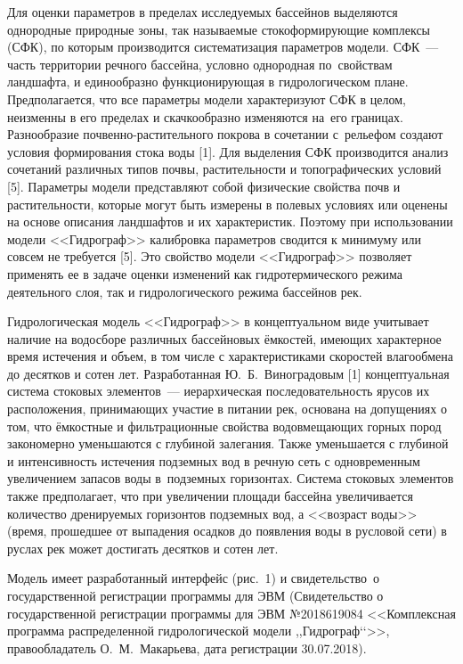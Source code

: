 Для оценки параметров в пределах исследуемых бассейнов выделяются однородные природные зоны, так называемые стокоформирующие комплексы (СФК), по которым производится систематизация параметров модели. СФК~--- часть территории речного бассейна, условно однородная по~свойствам ландшафта, и единообразно функционирующая в гидрологическом плане. Предполагается, что все параметры модели характеризуют СФК в целом, неизменны в его пределах и скачкообразно изменяются на~его границах. Разнообразие почвенно-растительного покрова в сочетании с~рельефом создают условия формирования стока воды [1]. Для выделения СФК производится анализ сочетаний различных типов почвы, растительности и топографических условий [5]. Параметры модели представляют собой физические свойства почв и растительности, которые могут быть измерены в полевых условиях или оценены на основе описания ландшафтов и их характеристик. Поэтому при использовании модели <<Гидрограф>> калибровка параметров сводится к минимуму или совсем не требуется [5]. Это свойство модели <<Гидрограф>> позволяет применять ее в задаче оценки изменений как гидротермического режима деятельного слоя, так и гидрологического режима бассейнов рек.

Гидрологическая модель <<Гидрограф>> в концептуальном виде учитывает наличие на водосборе различных бассейновых ёмкостей, имеющих характерное время истечения и объем, в том числе с характеристиками скоростей влагообмена до десятков и сотен лет. Разработанная Ю.~Б.~Виноградовым [1] концептуальная система стоковых элементов~--- иерархическая последовательность ярусов их расположения, принимающих участие в питании рек, основана на допущениях о том, что ёмкостные и фильтрационные свойства водовмещающих горных пород закономерно уменьшаются с глубиной залегания. Также уменьшается с глубиной и интенсивность истечения подземных вод в речную сеть с одновременным увеличением запасов воды в~подземных горизонтах. Система стоковых элементов также предполагает, что при увеличении площади бассейна увеличивается количество дренируемых горизонтов подземных вод, а <<возраст воды>> (время, прошедшее от выпадения осадков до появления воды в русловой сети) в руслах рек может достигать десятков и сотен лет.

Модель имеет разработанный интерфейс (рис.~1) и свидетельство о государственной регистрации программы для ЭВМ (Свидетельство о государственной регистрации программы для ЭВМ №2018619084 <<Комплексная программа распределенной гидрологической модели ,,Гидрограф‘‘>>, правообладатель О.~М.~Макарьева, дата регистрации 30.07.2018).

